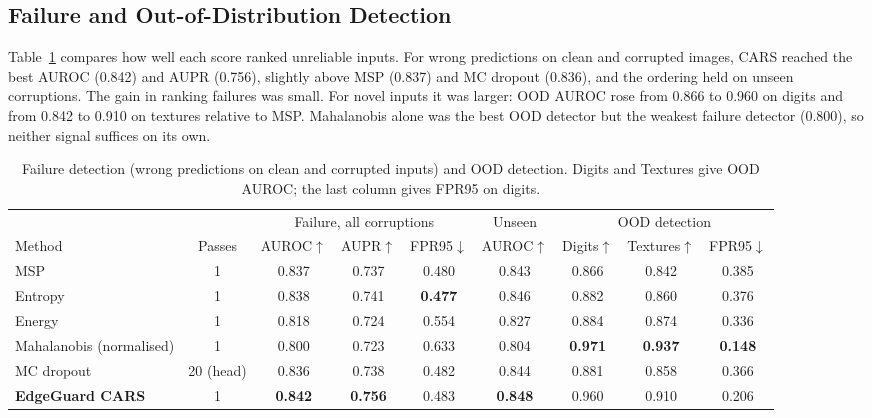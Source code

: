 \documentclass[conference]{IEEEtran}
\begin{document}
\subsection{Failure and Out-of-Distribution Detection}

Table~\ref{tab:detection} compares how well each score ranked unreliable inputs. For wrong predictions on clean and corrupted images, CARS reached the best AUROC (0.842) and AUPR (0.756), slightly above MSP (0.837) and MC dropout (0.836), and the ordering held on unseen corruptions. The gain in ranking failures was small. For novel inputs it was larger: OOD AUROC rose from 0.866 to 0.960 on digits and from 0.842 to 0.910 on textures relative to MSP. Mahalanobis alone was the best OOD detector but the weakest failure detector (0.800), so neither signal suffices on its own.

\begin{table}[t]
\centering
\caption{Failure detection (wrong predictions on clean and corrupted inputs) and OOD detection. Digits and Textures give OOD AUROC; the last column gives FPR95 on digits.}
\label{tab:detection}
\footnotesize
\setlength{\tabcolsep}{4pt}
\begin{tabular}{lcccccccc}
\toprule
 & & \multicolumn{3}{c}{Failure, all corruptions} & Unseen & \multicolumn{3}{c}{OOD detection} \\
\cmidrule(lr){3-5}\cmidrule(lr){6-6}\cmidrule(lr){7-9}
Method & Passes & AUROC$\uparrow$ & AUPR$\uparrow$ & FPR95$\downarrow$ & AUROC$\uparrow$ & Digits$\uparrow$ & Textures$\uparrow$ & FPR95$\downarrow$ \\
\midrule
MSP \cite{hendrycks2017baseline} & 1 & 0.837 & 0.737 & 0.480 & 0.843 & 0.866 & 0.842 & 0.385 \\
Entropy & 1 & 0.838 & 0.741 & \textbf{0.477} & 0.846 & 0.882 & 0.860 & 0.376 \\
Energy \cite{liu2020energy} & 1 & 0.818 & 0.724 & 0.554 & 0.827 & 0.884 & 0.874 & 0.336 \\
Mahalanobis (normalised) \cite{lee2018mahalanobis} & 1 & 0.800 & 0.723 & 0.633 & 0.804 & \textbf{0.971} & \textbf{0.937} & \textbf{0.148} \\
MC dropout \cite{gal2016dropout} & 20 (head) & 0.836 & 0.738 & 0.482 & 0.844 & 0.881 & 0.858 & 0.366 \\
\textbf{EdgeGuard CARS} & 1 & \textbf{0.842} & \textbf{0.756} & 0.483 & \textbf{0.848} & 0.960 & 0.910 & 0.206 \\
\bottomrule
\end{tabular}
\end{table}
\end{document}
